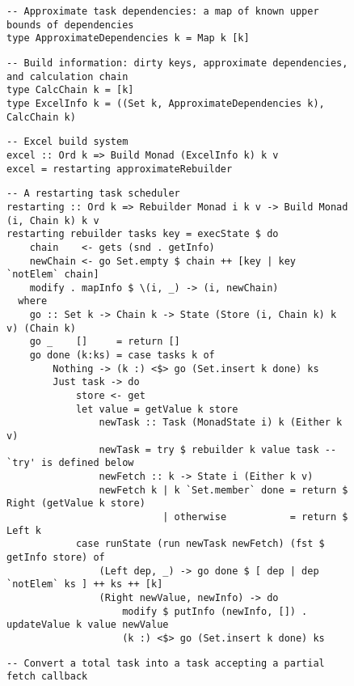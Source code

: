 \begin{figure}
\begin{verbatim}
-- Approximate task dependencies: a map of known upper bounds of dependencies
type ApproximateDependencies k = Map k [k]
\end{verbatim}
\vspace{1mm}
\begin{verbatim}
-- Build information: dirty keys, approximate dependencies, and calculation chain
type CalcChain k = [k]
type ExcelInfo k = ((Set k, ApproximateDependencies k), CalcChain k)
\end{verbatim}
\vspace{1mm}
\begin{verbatim}
-- Excel build system
excel :: Ord k => Build Monad (ExcelInfo k) k v
excel = restarting approximateRebuilder
\end{verbatim}
\vspace{1mm}
\begin{verbatim}
-- A restarting task scheduler
restarting :: Ord k => Rebuilder Monad i k v -> Build Monad (i, Chain k) k v
restarting rebuilder tasks key = execState $ do
    chain    <- gets (snd . getInfo)
    newChain <- go Set.empty $ chain ++ [key | key `notElem` chain]
    modify . mapInfo $ \(i, _) -> (i, newChain)
  where
    go :: Set k -> Chain k -> State (Store (i, Chain k) k v) (Chain k)
    go _    []     = return []
    go done (k:ks) = case tasks k of
        Nothing -> (k :) <$> go (Set.insert k done) ks
        Just task -> do
            store <- get
            let value = getValue k store
                newTask :: Task (MonadState i) k (Either k v)
                newTask = try $ rebuilder k value task -- `try' is defined below
                newFetch :: k -> State i (Either k v)
                newFetch k | k `Set.member` done = return $ Right (getValue k store)
                           | otherwise           = return $ Left k
            case runState (run newTask newFetch) (fst $ getInfo store) of
                (Left dep, _) -> go done $ [ dep | dep `notElem` ks ] ++ ks ++ [k]
                (Right newValue, newInfo) -> do
                    modify $ putInfo (newInfo, []) . updateValue k value newValue
                    (k :) <$> go (Set.insert k done) ks
\end{verbatim}
\vspace{1mm}
\begin{verbatim}
-- Convert a total task into a task accepting a partial fetch callback

\end{verbatim}
\end{figure}
